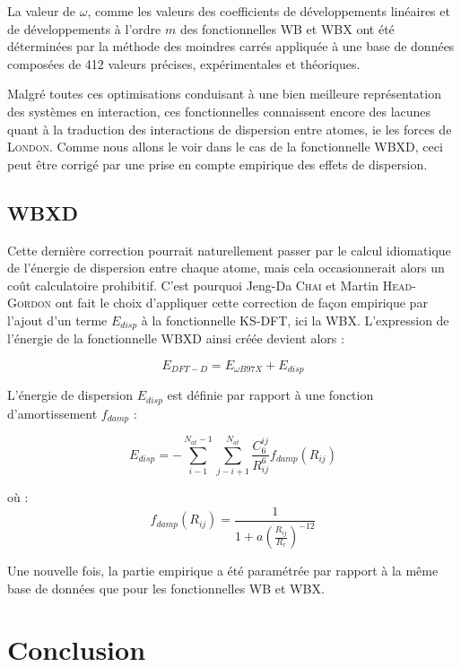 {{La valeur de $\omega$, comme les valeurs des coefficients de développements linéaires et de développements à l'ordre $m$ des fonctionnelles WB et WBX ont été déterminées par la méthode des moindres carrés appliquée à une base de données composées de 412 valeurs précises, expérimentales et théoriques.

Malgré toutes ces optimisations conduisant à une bien meilleure représentation des systèmes en interaction, ces fonctionnelles connaissent encore des lacunes quant à la traduction des interactions de dispersion entre atomes, ie les forces de \textsc{London}. Comme nous allons le voir dans le cas de la fonctionnelle WBXD, ceci peut être corrigé par une prise en compte empirique des effets de dispersion.

\subsection{WBXD}

Cette dernière correction pourrait naturellement passer par le calcul idiomatique de l'énergie de dispersion entre chaque atome, mais cela occasionnerait alors un coût calculatoire prohibitif. C'est pourquoi Jeng-Da \textsc{Chai} et Martin \textsc{Head-Gordon} ont fait le choix d'appliquer cette correction de façon empirique par l'ajout d'un terme $E_{disp}$ à la fonctionnelle KS-DFT, ici la WBX. L'expression de l'énergie de la fonctionnelle WBXD\cite{wB97XD} ainsi créée devient alors :

\begin{equation}
E_{DFT-D}=E_{\omega B97X}+E_{disp}
\end{equation}

L'énergie de dispersion $E_{disp}$ est définie par rapport à une fonction d'amortissement $f_{damp}$ :

\begin{equation}
E_{disp}=-\sum_{i-1}^{N_{at}-1} \sum_{j-i+1}^{N_{at}} \frac{C_{6}^{ij}}{R_{ij}^{6}}f_{damp} (R_{ij})
\end{equation}

\noindent où :
\begin{equation}
f_{damp} (R_{ij})=\frac{1}{1+a(\frac{R_{ij}}{R_{r}})^{-12}}
\end{equation}

Une nouvelle fois, la partie empirique a été paramétrée par rapport à la même base de données que pour les fonctionnelles WB et WBX.


\newpage

\section*{Conclusion}

}}
